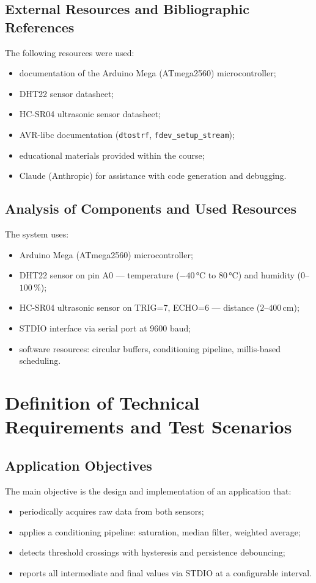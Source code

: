 \documentclass[12pt,a4paper]{article}
\begin{document}
\subsection{External Resources and Bibliographic References}
The following resources were used:
\begin{itemize}
    \item documentation of the Arduino Mega (ATmega2560) microcontroller;
    \item DHT22 sensor datasheet;
    \item HC-SR04 ultrasonic sensor datasheet;
    \item AVR-libc documentation (\texttt{dtostrf}, \texttt{fdev\_setup\_stream});
    \item educational materials provided within the course;
    \item Claude (Anthropic) for assistance with code generation and debugging.
\end{itemize}

\subsection{Analysis of Components and Used Resources}
The system uses:
\begin{itemize}
    \item Arduino Mega (ATmega2560) microcontroller;
    \item DHT22 sensor on pin A0 — temperature ($-40$\,°C to $80$\,°C) and humidity ($0$--$100$\,\%);
    \item HC-SR04 ultrasonic sensor on TRIG=7, ECHO=6 — distance ($2$--$400$\,cm);
    \item STDIO interface via serial port at 9600 baud;
    \item software resources: circular buffers, conditioning pipeline, millis-based scheduling.
\end{itemize}

\section{Definition of Technical Requirements and Test Scenarios}

\subsection{Application Objectives}
The main objective is the design and implementation of an application that:
\begin{itemize}
    \item periodically acquires raw data from both sensors;
    \item applies a conditioning pipeline: saturation, median filter, weighted average;
    \item detects threshold crossings with hysteresis and persistence debouncing;
    \item reports all intermediate and final values via STDIO at a configurable interval.
\end{itemize}
\end{document}
